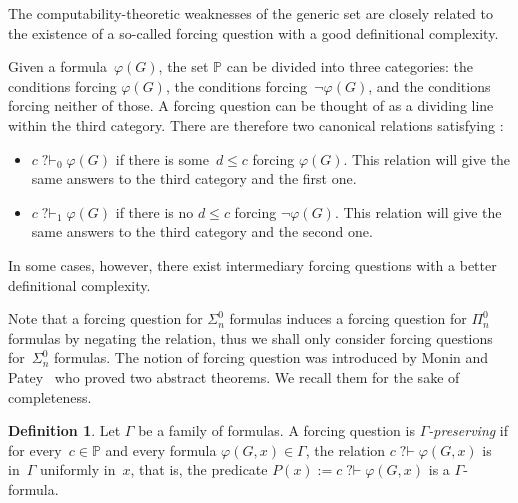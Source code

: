 \documentclass{article}
\def\PP{\mathbb{P}}
\def\PP{\mathbb{P}}
\newcommand{\qvdash}{\operatorname{{?}{\vdash}}}
\newcommand{\nqvdash}{\operatorname{{?}{\nvdash}}}
\numberwithin{theorem}{section}
\theoremstyle{definition}
\newtheorem{definition}[theorem]{Definition}
\begin{document}
The computability-theoretic weaknesses of the generic set are closely related to the existence of a so-called forcing question with a good definitional complexity.


Given a formula~$\varphi(G)$, the set $\PP$ can be divided into three categories: the conditions forcing $\varphi(G)$, the conditions forcing~$\neg \varphi(G)$, and the conditions forcing neither of those. 
A forcing question can be thought of as a dividing line within the third category. There are therefore two canonical relations satisfying :
\begin{itemize}
    \item $c \qvdash_0 \varphi(G)$ if there is some~$d \leq c$ forcing $\varphi(G)$. This relation will give the same answers to the third category and the first one.
    \item $c \qvdash_1 \varphi(G)$ if there is no $d \leq c$ forcing $\neg \varphi(G)$. This relation will give the same answers to the third category and the second one.
\end{itemize}
In some cases, however, there exist intermediary forcing questions with a better definitional complexity.

Note that a forcing question for $\Sigma^0_n$ formulas induces a forcing question for $\Pi^0_n$ formulas by negating the relation, thus we shall only consider forcing questions for~$\Sigma^0_n$ formulas. The notion of forcing question was introduced by Monin and Patey~\cite[Section 2]{monin201pigeons} who proved two abstract theorems. We recall them for the sake of completeness.

\begin{definition}
Let $\Gamma$ be a family of formulas. A forcing question is \emph{$\Gamma$-preserving} if for every~$c \in \PP$
and every formula $\varphi(G, x) \in \Gamma$, the relation $c \qvdash \varphi(G, x)$ is in~$\Gamma$ uniformly in~$x$, that is, the predicate $P(x) := c \qvdash \varphi(G, x)$ is a $\Gamma$-formula.
\end{definition}
\end{document}
